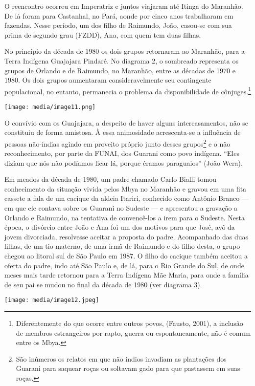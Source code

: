O reencontro ocorreu em Imperatriz e juntos viajaram até Itinga do
Maranhão. De lá foram para Castanhal, no Pará, aonde por cinco anos
trabalharam em fazendas. Nesse período, um dos filho de Raimundo, João,
casou-se com sua prima de segundo grau (FZDD), Ana, com quem tem duas
filhas.

No princípio da década de 1980 os dois grupos retornaram ao Maranhão,
para a Terra Indígena Guajajara Pindaré. No diagrama 2, o sombreado
representa os grupos de Orlando e de Raimundo, no Maranhão, entre as
décadas de 1970 e 1980. Os dois grupos aumentaram consideravelmente seu
contingente populacional, no entanto, permanecia o problema da
disponibilidade de cônjuges.\footnote{Diferentemente do que ocorre entre
  outros povos, (Fausto, 2001), a inclusão de membros estrangeiros por
  rapto, guerra ou espontaneamente, não é comum entre os Mbya.}

\texttt{[image: media/image11.png]}

O convívio com os Guajajara, a despeito de haver alguns intercasamentos,
não se constituiu de forma amistosa. À essa animosidade acrescenta-se a
influência de pessoas não-índias agindo em proveito próprio junto desses
grupos\footnote{São inúmeros os relatos em que não índios invadiam as
  plantações dos Guarani para saquear roças ou soltavam gado para que
  pastassem em suas roças.} e o não reconhecimento, por parte da FUNAI,
dos Guarani como povo indígena. ``Eles diziam que nós não podíamos ficar
lá, porque éramos paraguaios'' (João Wera).

Em meados da década de 1980, um padre chamado Carlo Bialli tomou
conhecimento da situação vivida pelos Mbya no Maranhão e gravou em uma
fita cassete a fala de um cacique da aldeia Itariri, conhecido como
Antônio Branco --- em que ele contava sobre os Guarani no Sudeste --- e
apresentou a gravação a Orlando e Raimundo, na tentativa de convencê-los
a irem para o Sudeste. Nesta época, o divórcio entre João e Ana foi um
dos motivos para que José, avô da jovem divorciada, resolvesse aceitar a
proposta do padre. Acompanhado das duas filhas, de um tio materno, de
uma irmã de Raimundo e do filho desta, o grupo chegou ao litoral sul de
São Paulo em 1987. O filho do cacique também aceitou a oferta do padre,
indo até São Paulo e, de lá, para o Rio Grande do Sul, de onde meses
mais tarde retornou para a Terra Indígena Mãe Maria, para onde a família
de seu pai se mudou no final da década de 1980 (ver diagrama 3).

\texttt{[image: media/image12.jpeg]}

